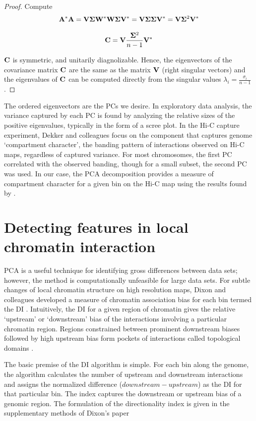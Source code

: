 \begin{proof}
  Compute
  \[
    \mathbf{A}^*\mathbf{A} =
    \mathbf{V\Sigma}\mathbf{W}^*\mathbf{W\Sigma}\mathbf{V}^* =
    \mathbf{V\Sigma\Sigma}\mathbf{V}^* =
    \mathbf{V}\mathbf{\Sigma}^2\mathbf{V}^*
  \]

  \[
    \mathbf{C} = \mathbf{V}\frac{\mathbf{\Sigma}^2}{n - 1}\mathbf{V}^*
  \]

  $\mathbf{C}$ is symmetric, and unitarily diagnolizable.  Hence, the eigenvectors of the covariance matrix $\mathbf{C}$ are the same as the
  matrix $\mathbf{V}$ (right singular vectors) and the eigenvalues of $\mathbf{C}$ can be computed directly from the singular values
  $\lambda_i = \frac{\sigma_i}{n - 1}$.
\end{proof}

The ordered eigenvectors are the \glspl{PC} we desire.  In exploratory data analysis, the variance captured by each \gls{PC} is found
by analyzing the relative sizes of the positive eigenvalues, typically in the form of a scree plot.  In the Hi-C capture experiment, Dekker
and colleagues \citep{dekker2012} focus on the component that captures genome `compartment character', the banding pattern of interactions
observed on Hi-C maps, regardless of captured variance.  For most chromosomes, the first \gls{PC} correlated with the observed banding, though
for a small subset, the second \gls{PC} was used.  In our case, the \gls{PCA} decomposition provides a measure of compartment character
for a given bin on the Hi-C map using the results found by \citet{dekker2012}.

\section*{Detecting features in local chromatin interaction}

\gls{PCA} is a useful technique for identifying gross differences between data sets; however, the method is computationally unfeasible for large
data sets.  For subtle changes of local chromatin structure on high resolution maps, Dixon and colleagues developed a measure of chromatin
association bias for each bin termed the \gls{DI} \citep{dixon2012}.  Intuitively, the \gls{DI} for a given region of chromatin gives the
relative `upstream' or `downstream' bias of the interactions involving a particular chromatin region.  Regions constrained between prominent
downstream biases followed by high upstream bias form pockets of interactions called topological domains \citep{dixon2012}.

The basic premise of the \gls{DI} algorithm is simple.  For each bin along the genome, the algorithm calculates the number of upstream and downstream
interactions and assigns the normalized difference ($downstream - upstream$) as the \gls{DI} for that particular bin.  The index captures the
downstream or upstream bias of a genomic region. The formulation of the directionality index is given in the supplementary methods
of Dixon's paper \citep{dixon2012}

